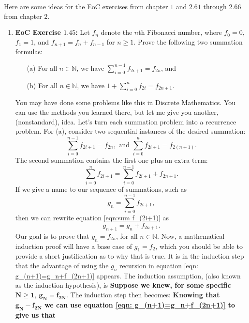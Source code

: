 \documentclass[12pt,letterpaper]{article}
\theoremstyle{definition}
\begin{document}
Here are some ideas for the EoC exercises from chapter $1$ and $2.61$ through $2.66$ from chapter $2$.
\begin{enumerate}
    \item {\bfseries EoC Exercise $1.45$:} Let $f_n$ denote the $n$th Fibonacci number, where $f_0=0$, $f_1=1$, and $f_{n+1}=f_n+f_{n-1}$ for $n\geq 1$. Prove the following two summation formulas:
    \begin{enumerate}
        \item[(a)]  For all $n\in\mathbb{N}$, we have
            $\sum_{i=0}^{n-1} f_{2i+1} = f_{2n}$, and
        \item[(b)] For all $n\in\mathbb{N}$, we have
            $1 + \sum_{i=0}^n f_{2i} = f_{2n+1}$.
    \end{enumerate}
    You may have done some problems like this in Discrete Mathematics. You can use the methods you learned there, but let me give you another, (nonstandard), idea. Let's turn each summation problem into a recurrence problem. For (a), consider two sequential instances of the desired summation:
    \[
        \sum_{i=0}^{n-1} f_{2i+1} = f_{2n}, \text{ and }
        \sum_{i=0}^{n} f_{2i+1} = f_{2(n+1)}.
    \]
    The second summation contains the first one plus an extra term:
    \begin{equation}\label{eqn:sum f_(2i+1)}
         \sum_{i=0}^{n} f_{2i+1} = \sum_{i=0}^{n-1} f_{2i+1} +f_{2n+1}.
    \end{equation}
    If we give a name to our sequence of summations, such as
    \[
        g_n = \sum_{i=0}^{n-1} f_{2i+1},
    \] 
    then we can rewrite equation \eqref{eqn:sum f_(2i+1)} as
    \begin{equation}\label{eqn: g_(n+1)=g_n+f_(2n+1)}
        g_{n+1} = g_n + f_{2n+1}.
    \end{equation}
    Our goal is to prove that $g_n = f_{2n}$, for all $n\in\mathbb{N}$.
    Now, a mathematical induction proof will have a base case of
    $g_1=f_2$, which you should be able to provide a short justification as
    to why that is true. It is in the induction step that the advantage of
    using the $g_n$ recursion in equation \eqref{eqn: g_(n+1)=g_n+f_(2n+1)}
    appears. The induction assumption, (also known as the induction
    hypothesis), is
    \textbf{Suppose we knew, for some specific $\mathbf{N\geq 1,\ 
    g_N=f_{2N}}$}. The induction step then becomes: \textbf{Knowing that
    $\mathbf{g_N-f_{2N}}$ we can use equation \eqref{eqn:
    g_(n+1)=g_n+f_(2n+1)} to  give us that}
    \begin{equation}\label{eqn: g_(N+1) = f_(2N+2)}

\end{equation}
\end{enumerate}
\end{document}
